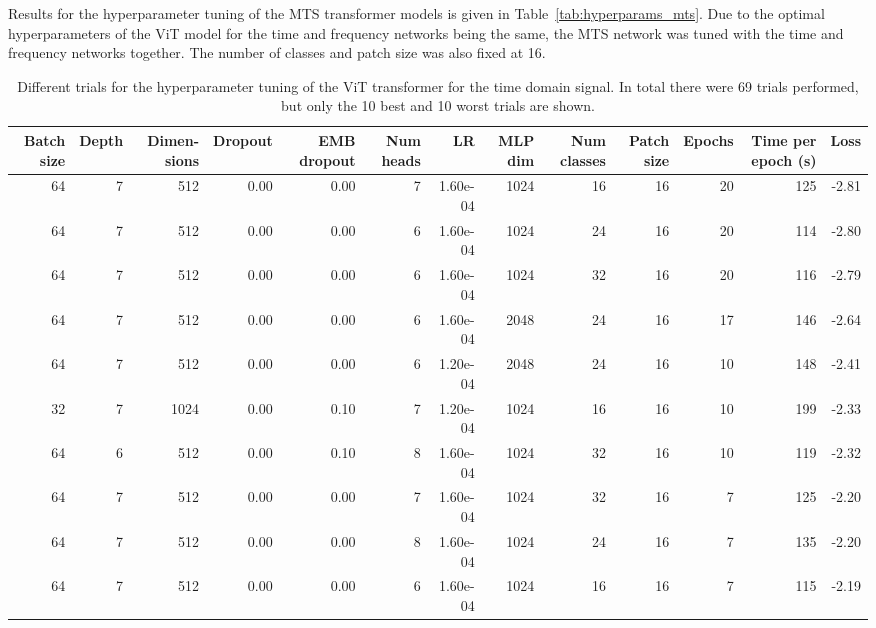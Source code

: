 \begin{appendices}
Results for the hyperparameter tuning of the MTS transformer models is given in Table~\ref{tab:hyperparams_mts}. Due to the optimal hyperparameters of the ViT model for the time and frequency networks being the same, the MTS network was tuned with the time and frequency networks together. The number of classes and patch size was also fixed at 16.

\begin{table}
\caption{Different trials for the hyperparameter tuning of the ViT transformer for the time domain signal. In total there were 69 trials performed, but only the 10 best and 10 worst trials are shown.}
\label{tab:hyperparams_vit_t}
\begin{tabular}{rrrrrrrrrrrrr}
\toprule
\multicolumn{1}{p{0.5cm}}{\raggedleft Batch size} & 
\multicolumn{1}{p{0.5cm}}{\raggedleft Depth} & 
\multicolumn{1}{p{1.0cm}}{\raggedleft Dimen-sions} & 
\multicolumn{1}{p{1.0cm}}{\raggedleft Dropout} & 
\multicolumn{1}{p{1.0cm}}{\raggedleft EMB dropout} & 
\multicolumn{1}{p{1.0cm}}{\raggedleft Num heads} & 
\multicolumn{1}{p{0.5cm}}{\raggedleft LR} & 
\multicolumn{1}{p{0.5cm}}{\raggedleft MLP dim} & 
\multicolumn{1}{p{1.0cm}}{\raggedleft Num classes} & 
\multicolumn{1}{p{1.0cm}}{\raggedleft Patch size} & 
\multicolumn{1}{p{1.0cm}}{\raggedleft Epochs} & 
\multicolumn{1}{p{1.5cm}}{\raggedleft Time per epoch (s)} & 
\multicolumn{1}{p{0.5cm}}{\raggedleft Loss} \\
\midrule
64 & 7 & 512 & 0.00 & 0.00 & 7 & 1.60e-04 & 1024 & 16 & 16 & 20 & 125 & -2.81 \\
64 & 7 & 512 & 0.00 & 0.00 & 6 & 1.60e-04 & 1024 & 24 & 16 & 20 & 114 & -2.80 \\
64 & 7 & 512 & 0.00 & 0.00 & 6 & 1.60e-04 & 1024 & 32 & 16 & 20 & 116 & -2.79 \\
64 & 7 & 512 & 0.00 & 0.00 & 6 & 1.60e-04 & 2048 & 24 & 16 & 17 & 146 & -2.64 \\
64 & 7 & 512 & 0.00 & 0.00 & 6 & 1.20e-04 & 2048 & 24 & 16 & 10 & 148 & -2.41 \\
32 & 7 & 1024 & 0.00 & 0.10 & 7 & 1.20e-04 & 1024 & 16 & 16 & 10 & 199 & -2.33 \\
64 & 6 & 512 & 0.00 & 0.10 & 8 & 1.60e-04 & 1024 & 32 & 16 & 10 & 119 & -2.32 \\
64 & 7 & 512 & 0.00 & 0.00 & 7 & 1.60e-04 & 1024 & 32 & 16 & 7 & 125 & -2.20 \\
64 & 7 & 512 & 0.00 & 0.00 & 8 & 1.60e-04 & 1024 & 24 & 16 & 7 & 135 & -2.20 \\
64 & 7 & 512 & 0.00 & 0.00 & 6 & 1.60e-04 & 1024 & 16 & 16 & 7 & 115 & -2.19 \\

\end{tabular}
\end{table}
\end{appendices}
